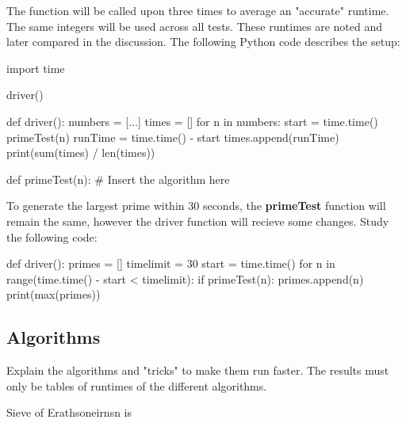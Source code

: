 \documentclass[main.tex]{subfiles}
\begin{document}
The function will be called upon three times to average an "accurate" runtime. The same integers will be used across all tests. These runtimes are noted and later compared in the discussion. The following Python code describes the setup:

\begin{python}
    import time

    driver()

    def driver():
        numbers = [...]
        times = []
        for n in numbers:
            start = time.time()
            primeTest(n)
            runTime = time.time() - start
            times.append(runTime)
        print(sum(times) / len(times))

    def primeTest(n):
        # Insert the algorithm here
\end{python}

To generate the largest prime within 30 seconds, the \textbf{primeTest} function will remain the same, however the driver function will recieve some changes. Study the following code:

\begin{python}
    def driver():
        primes = []
        timelimit = 30
        start = time.time()
        for n in range(time.time() - start < timelimit):
            if primeTest(n):
                primes.append(n)
        print(max(primes))
\end{python}

\subsection{Algorithms}
Explain the algorithms and "tricks" to make them run faster. The results must only be tables of runtimes of the different algorithms.

Sieve of Erathsoneirnsn is 
\end{document}
